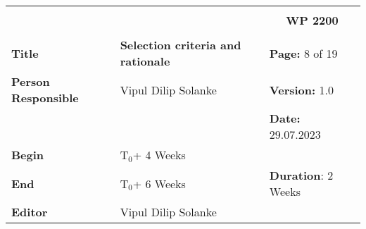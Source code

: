 \begin{table}[!h]
  \begin{center}
    \begin{tabular}{|p{35mm}||p{55mm}|p{50mm}||p{40mm}|}
      \hline
      \multicolumn{3}{|l||}{\textbf{}} & \multicolumn{1}{c|}{}                                                                                                                                                \\
      \multicolumn{3}{|l||}{\textbf{}} & \multicolumn{1}{c|}{\textbf{WP 2200}}                                                                                                                                \\
      \multicolumn{3}{|l||}{\textbf{}} & \multicolumn{1}{c|}{}                                                                                                                                                \\
      \hline\hline
      \textbf{Title}                   & \multicolumn{2}{p{7cm}||}{\textbf{Selection criteria and rationale}}
                                       & \textbf{Page:} 8 of 19                                                                                                                                             \\
      \hline
      \textbf{Person Responsible}        & \multicolumn{2}{l||}{Vipul Dilip Solanke}                                                                                                   & \textbf{Version:} 1.0   \\
      \hline
      \multicolumn{3}{|l||}{}          & \textbf{Date:} 29.07.2023                                                                                                                                          \\
      \hline\hline
      \textbf{Begin}                  & \multicolumn{2}{l||}{T$_0$+ 4 Weeks}                                                                                                                &                         \\
      \hline
      \textbf{End}                    & \multicolumn{2}{l||}{T$_0$+ 6 Weeks}                                                                                                        & \textbf{Duration}: 2 Weeks \\
      \hline\hline
      \textbf{Editor}              & \multicolumn{3}{l|}{Vipul Dilip Solanke}                                                                                                                              \\

\end{tabular}
\end{center}
\end{table}
